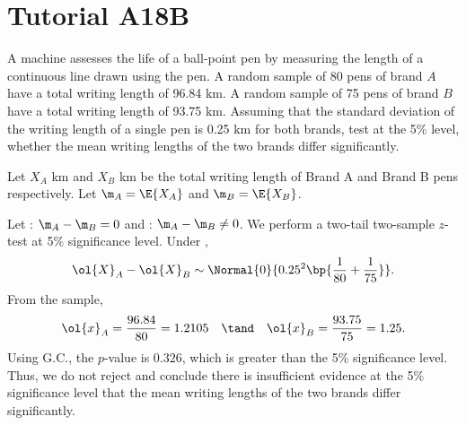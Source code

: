 \section{Tutorial A18B}

\begin{problem}
    A machine assesses the life of a ball-point pen by measuring the length of a continuous line drawn using the pen. A random sample of 80 pens of brand $A$ have a total writing length of 96.84 km. A random sample of 75 pens of brand $B$ have a total writing length of 93.75 km. Assuming that the standard deviation of the writing length of a single pen is 0.25 km for both brands, test at the 5\% level, whether the mean writing lengths of the two brands differ significantly.
\end{problem}
\begin{solution}
    Let $X_A$ km and $X_B$ km be the total writing length of Brand A and Brand B pens respectively. Let $\m_A = \E{X_A}$ and $\m_B = \E{X_B}$.
    
    Let \nullhyp: $\m_A - \m_B = 0$ and \althyp: $\m_A - \m_B \neq 0$. We perform a two-tail two-sample $z$-test at 5\% significance level. Under \nullhyp, \[\ol{X}_A - \ol{X}_B \sim \Normal{0}{0.25^2 \bp{\frac1{80} + \frac1{75}}}.\] From the sample, \[\ol{x}_A = \frac{96.84}{80} = 1.2105 \quad \tand \quad \ol{x}_B = \frac{93.75}{75} = 1.25.\] Using G.C., the $p$-value is $0.326$, which is greater than the 5\% significance level. Thus, we do not reject \nullhyp{} and conclude there is insufficient evidence at the 5\% significance level that the mean writing lengths of the two brands differ significantly.
\end{solution}

